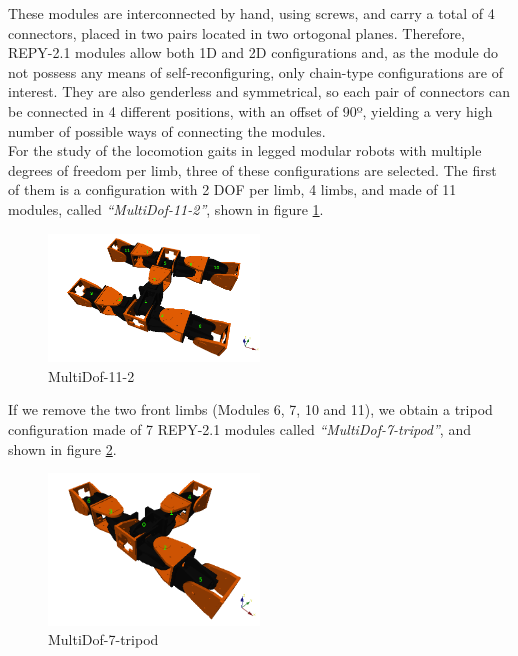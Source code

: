 These modules are interconnected by hand, using screws, and carry a total of 4 connectors, placed in two pairs located in two ortogonal planes. Therefore, REPY-2.1 modules allow both 1D and 2D configurations and, as the module do not possess any means of self-reconfiguring, only chain-type configurations are of interest. They are also genderless and symmetrical, so each pair of connectors can be connected in 4 different positions, with an offset of 90º, yielding a very high number of possible ways of connecting the modules.\\

For the study of the locomotion gaits in legged modular robots with multiple degrees of freedom per limb, three of these configurations are selected. The first of them is a configuration with 2 DOF per limb, 4 limbs, and made of 11 modules, called \emph{``MultiDof-11-2''}, shown in figure \ref{fig:config_repy2_multidof-11-2}.\\

\begin{figure}[b]
		\centering
        \includegraphics[width=0.5\textwidth]{images/Conf_repy2_multidof-11-2.png}
        \caption{MultiDof-11-2}
        \label{fig:config_repy2_multidof-11-2}
\end{figure}

If we remove the two front limbs (Modules 6, 7, 10 and 11), we obtain a tripod configuration made of 7 REPY-2.1 modules called \emph{``MultiDof-7-tripod''}, and shown in figure \ref{fig:config_repy2_multidof-7-tripod}.\\

\begin{figure}[t]
		\centering
        \includegraphics[width=0.5\textwidth]{images/Conf_repy2_multidof-7-tripod.png}
        \caption{MultiDof-7-tripod}
        \label{fig:config_repy2_multidof-7-tripod}
\end{figure}

